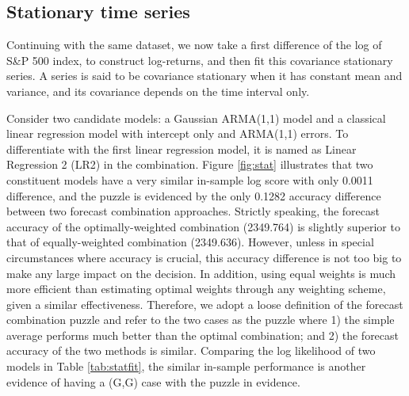 \documentclass{monashthesis}
\begin{document}
\hypertarget{stationary-time-series}{%
\subsection{Stationary time series}\label{stationary-time-series}}

Continuing with the same dataset, we now take a first difference of the log of S\&P 500 index, to construct log-returns, and then fit this covariance stationary series. A series is said to be covariance stationary when it has constant mean and variance, and its covariance depends on the time interval only.

Consider two candidate models: a Gaussian ARMA(1,1) model and a classical linear regression model with intercept only and ARMA(1,1) errors. To differentiate with the first linear regression model, it is named as Linear Regression 2 (LR2) in the combination. Figure \ref{fig:stat} illustrates that two constituent models have a very similar in-sample log score with only 0.0011 difference, and the puzzle is evidenced by the only 0.1282 accuracy difference between two forecast combination approaches. Strictly speaking, the forecast accuracy of the optimally-weighted combination (2349.764) is slightly superior to that of equally-weighted combination (2349.636). However, unless in special circumstances where accuracy is crucial, this accuracy difference is not too big to make any large impact on the decision. In addition, using equal weights is much more efficient than estimating optimal weights through any weighting scheme, given a similar effectiveness. Therefore, we adopt a loose definition of the forecast combination puzzle and refer to the two cases as the puzzle where 1) the simple average performs much better than the optimal combination; and 2) the forecast accuracy of the two methods is similar. Comparing the log likelihood of two models in Table \ref{tab:statfit}, the similar in-sample performance is another evidence of having a (G,G) case with the puzzle in evidence.
\end{document}
